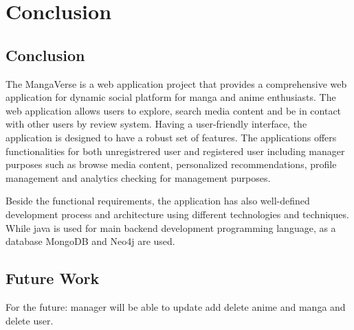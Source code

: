 \chapter{Conclusion}

\section{Conclusion}
The MangaVerse is a web application project that provides a comprehensive web application for 
dynamic social platform for manga and anime enthusiasts. The web application allows users to explore, search media content
and be in contact with other users by review system. Having a user-friendly interface, the application is designed to have a robust set of features.
The applications offers functionalities for both unregistrered user and registered user including manager purposes such as browse 
media content, personalized recommendations, profile management and analytics checking for management purposes.

Beside the functional requirements, the application has also well-defined development process and architecture using 
different technologies and techniques. While java is used for main backend development programming language, as a database MongoDB and
Neo4j are used. 


\section{Future Work}
For the future: manager will be able to update add delete anime and manga and delete user.

